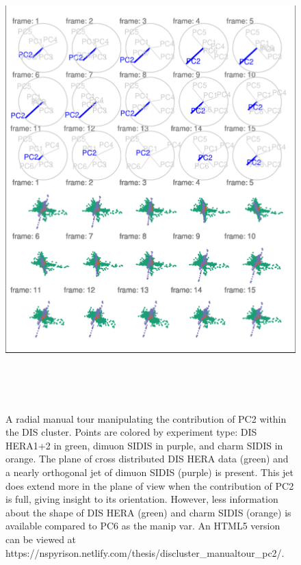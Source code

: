 \begin{Schunk}
\begin{figure}

{\centering \includegraphics[width=5.83in,height=7in]{spinifex_paper_files/figure-latex/DISclusterBad-1} 

}

\caption[A radial manual tour manipulating the contribution of PC2 within the DIS cluster]{A radial manual tour manipulating the contribution of PC2 within the DIS cluster. Points are colored by experiment type: DIS HERA1+2 in green, dimuon SIDIS in purple, and charm SIDIS in orange. The plane of cross distributed DIS HERA data (green) and a nearly orthogonal jet of dimuon SIDIS (purple) is present. This jet does extend more in the plane of view when the contribution of PC2 is full, giving insight to its orientation. However, less information about the shape of DIS HERA (green) and charm SIDIS (orange) is available compared to PC6 as the manip var. An HTML5 version can be viewed at https://nspyrison.netlify.com/thesis/discluster\_manualtour\_pc2/.}\label{fig:DISclusterBad}
\end{figure}
\end{Schunk}

